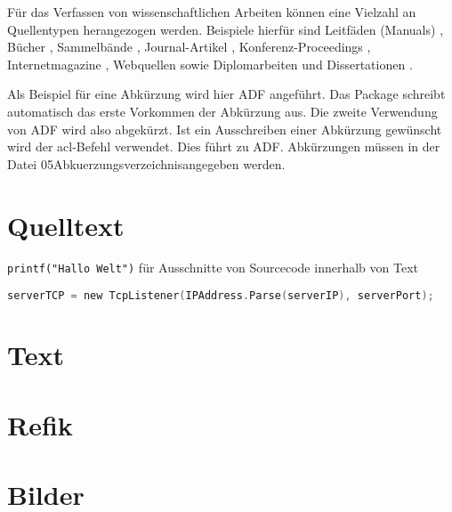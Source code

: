 Für das Verfassen von wissenschaftlichen Arbeiten können eine Vielzahl an Quellentypen herangezogen werden. Beispiele hierfür sind Leitfäden (Manuals) \citep{RFC2828} \citep{80211i} \citep{80211} \cite{X800} \citep{TR102377} \citep{EN301893} \citep{PUB197} \citep{PUB74}, Bücher \citep{Fis04a} \citep{Rei05a} \citep{Tan00a} \citep{Ste04a} \citep{GMS00a} \citep{HL98a}, Sammelbände \citep{EHL00a} \citep{Sch94a}, Journal-Artikel \citep{TM03a} \citep{CP03a}, Konferenz-Proceedings \citep{HCB00a} \citep{KBW04a} \citep{KSW04a} \citep{HK05a}, Internetmagazine \citep{Eke05a}, Webquellen \cite{nist} \cite{php} \cite{BDKMT93a} \cite{IDSSM} sowie Diplomarbeiten und Dissertationen \citep{Sch98} \cite{Hae94a}.

Als Beispiel für eine Abkürzung wird hier \ac{ADF} angeführt. Das Package schreibt automatisch das erste Vorkommen der Abkürzung aus. Die zweite Verwendung von \ac{ADF} wird also abgekürzt. Ist ein Ausschreiben einer Abkürzung gewünscht wird der acl-Befehl verwendet. Dies führt zu \acl{ADF}. Abkürzungen müssen in der Datei \glqq 05Abkuerzungsverzeichnis\grqq angegeben werden.

\section{Quelltext}

\texttt{printf("Hallo Welt")} für Ausschnitte von Sourcecode innerhalb von Text

\begin{lstlisting}[language=C,
caption=Beispiel-Listing,
label=LST_SAMPLE]
serverTCP = new TcpListener(IPAddress.Parse(serverIP), serverPort);
\end{lstlisting}


\section{Text}

\section{Refik}

\section{Bilder}

